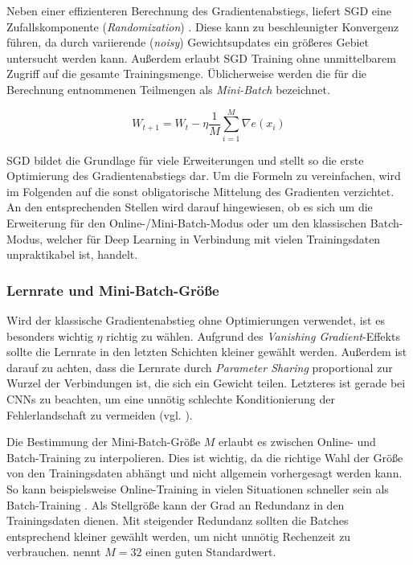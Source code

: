 Neben einer effizienteren Berechnung des Gradientenabstiegs, liefert SGD eine Zufallskomponente (\textit{Randomization}) \cite[vgl. hierzu und im Folgenden][]{Bengio2012}. Diese kann zu beschleunigter Konvergenz führen, da durch variierende (\textit{noisy}) Gewichtsupdates ein größeres Gebiet untersucht werden kann. Außerdem erlaubt SGD Training ohne unmittelbarem Zugriff auf die gesamte Trainingsmenge. Üblicherweise werden die für die Berechnung entnommenen Teilmengen als \textit{Mini-Batch} bezeichnet.

\begin{equation}
\label{eq:sgd} 
W_{t+1} = W_t - \eta \frac{1}{M} \sum_{i=1}^{M} \nabla e(x_i)
\end{equation}

SGD bildet die Grundlage für viele Erweiterungen und stellt so die erste Optimierung des Gradientenabstiegs dar. 
Um die Formeln zu vereinfachen, wird im Folgenden auf die sonst obligatorische Mittelung des Gradienten verzichtet. An den entsprechenden Stellen wird darauf hingewiesen, ob es sich um die Erweiterung für den Online-/Mini-Batch-Modus oder um den klassischen Batch-Modus, welcher für Deep Learning in Verbindung mit vielen Trainingsdaten unpraktikabel ist, handelt. 

\subsubsection{Lernrate und Mini-Batch-Größe}

Wird der klassische Gradientenabstieg ohne Optimierungen verwendet, ist es besonders wichtig $\eta$ richtig zu wählen. Aufgrund des \textit{Vanishing Gradient}-Effekts sollte die Lernrate in den letzten Schichten kleiner gewählt werden. Außerdem ist darauf zu achten, dass die Lernrate durch \textit{Parameter Sharing} proportional zur Wurzel der Verbindungen ist, die sich ein Gewicht teilen. Letzteres ist gerade bei CNNs zu beachten, um eine unnötig schlechte Konditionierung der Fehlerlandschaft zu vermeiden (vgl. \cite{LeCun1998b}).

Die Bestimmung der Mini-Batch-Größe $M$ erlaubt es zwischen Online- und Batch-Training zu interpolieren. Dies ist wichtig, da die richtige Wahl der Größe von den Trainingsdaten abhängt und nicht allgemein vorhergesagt werden kann. So kann beispielsweise Online-Training in vielen Situationen schneller sein als Batch-Training  \cite[vgl.][]{Wilson2003}. Als Stellgröße kann der Grad an Redundanz in den Trainingsdaten dienen. Mit steigender Redundanz sollten die Batches entsprechend kleiner gewählt werden, um nicht unnötig Rechenzeit zu verbrauchen. \cite{Bengio2012} nennt $M = 32$ einen guten Standardwert.

